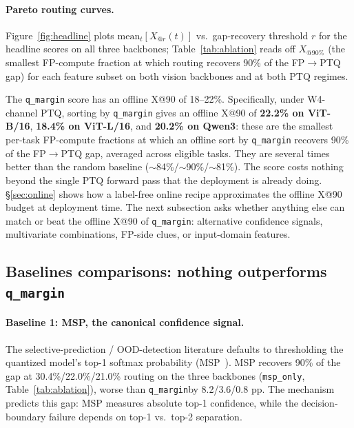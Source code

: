 \documentclass{article}
\makeatletter
\newcommand{\fp}{\textsc{FP}\xspace}
\newcommand{\ptq}{\textsc{PTQ}\xspace}
\newcommand{\xat}[1]{\ensuremath{X_{@#1\%}}}
\makeatother
\begin{document}
\paragraph{Pareto routing curves.}
Figure~\ref{fig:headline} plots $\mathrm{mean}_t[X_{@r}(t)]$ vs.\ gap-recovery threshold $r$ for the headline scores on all three backbones; Table~\ref{tab:ablation} reads off \xat{90} (the smallest \fp{}-compute fraction at which routing recovers 90\% of the \fp$\to$\ptq{} gap) for each feature subset on both vision backbones and at both \ptq{} regimes.

The \texttt{q\_margin} score has an offline X@90 of 18--22\%. Specifically, under W4-channel PTQ, sorting by \texttt{q\_margin} gives an offline X@90 of \textbf{22.2\% on ViT-B/16}, \textbf{18.4\% on ViT-L/16}, and \textbf{20.2\% on Qwen3}: these are the smallest per-task FP-compute fractions at which an offline sort by \texttt{q\_margin} recovers 90\% of the \fp$\to$\ptq{} gap, averaged across eligible tasks. They are several times better than the random baseline ($\sim$84\%/$\sim$90\%/$\sim$81\%). The score costs nothing beyond the single \ptq{} forward pass that the deployment is already doing. \S\ref{sec:online} shows how a label-free online recipe approximates the offline X@90 budget at deployment  time. The next subsection asks whether anything else can match or beat the offline X@90 of \texttt{q\_margin}: alternative confidence signals, multivariate combinations, FP-side clues, or input-domain features.

\subsection{Baselines comparisons: nothing outperforms \texttt{q\_margin}}\label{sec:ablation}

\paragraph{Baseline 1: MSP, the canonical confidence signal.}
The selective-prediction / OOD-detection literature defaults to thresholding the quantized model's top-1 softmax probability (MSP~\cite{hendrycks2017baseline,geifman2017selective}). MSP recovers 90\% of the gap at 30.4\%/22.0\%/21.0\% routing on the three backbones (\texttt{msp\_only}, Table~\ref{tab:ablation}), worse than \texttt{q\_margin}by 8.2/3.6/0.8 pp. The mechanism predicts this gap: MSP measures absolute top-1 confidence, while the decision-boundary failure depends on top-1 vs.\ top-2 separation.
\end{document}

